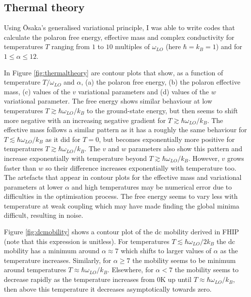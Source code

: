 \subsection{Thermal theory}

Using \=Osaka's generalised variational principle, I was able to write codes that calculate the polaron free energy, effective mass and complex conductivity for temperatures $T$ ranging from $1$ to $10$ multiples of $\omega_{LO}$ (here $\hbar = k_B = 1$) and for $1\leq\alpha\leq12$. 

In Figure \ref{fig:thermaltheory} are contour plots that show, as a function of temperature $T / \omega_{LO}$ and $\alpha$, (a) the polaron free energy, (b) the polaron effective mass, (c) values of the $v$ variational parameters and (d) values of the $w$ variational parameter. The free energy shows similar behaviour at low temperatures $T \gtrsim \hbar \omega_{LO} / k_B$ to the ground-state energy, but then seems to shift more negative with an increasing negative gradient for $T \gtrsim \hbar \omega_{LO} / k_B$. The effective mass follows a similar pattern as it has a roughly the same behaviour for $T \lesssim \hbar \omega_{LO} / k_B$ as it did for $T = 0$, but becomes exponentially more positive for temperatures $T \gtrsim \hbar \omega_{LO} / k_B$. The $v$ and $w$ parameters also show this pattern and increase exponentially with temperature beyond $T \gtrsim \hbar \omega_{LO} / k_B$. However, $v$ grows faster than $w$ so their difference increases exponentially with temperature too. The artefacts that appear in contour plots for the effective mass and variational parameters at lower $\alpha$ and high temperatures may be numerical error due to difficulties in the optimisation process. The free energy seems to vary less with temperature at weak coupling which may have made finding the global minima difficult, resulting in noise. 

Figure \ref{fig:dcmobility} shows a contour plot of the dc mobility derived in FHIP (note that this expression is unitless). For temperatures $T \lesssim \hbar \omega_{LO} / 2 k_B$ the dc mobility has a minimum around $\alpha \approx 7$ which shifts to larger values of $\alpha$ as the temperature increases. Similarly, for $\alpha \geq 7$ the mobility seems to be minimum around temperatures $T \approx \hbar \omega_{LO} / k_B$. Elsewhere, for $\alpha < 7$ the mobility seems to decrease rapidly as the temperature increases from $0$K up until $T \approx \hbar \omega_{LO} / k_B$, then above this temperature it decreases asymptotically towards zero.

